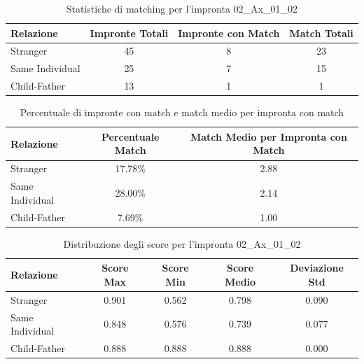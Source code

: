 \begin{table}[htbp]
\centering
\caption{Statistiche di matching per l'impronta 02\_Ax\_01\_02}
\label{tab:results_02_Ax_01_02}
\begin{tabular}{|l|c|c|c|}
\hline
\textbf{Relazione} & \textbf{Impronte Totali} & \textbf{Impronte con Match} & \textbf{Match Totali} \\
\hline
Stranger & 45 & 8 & 23 \\
\hline
Same Individual & 25 & 7 & 15 \\
\hline
Child-Father & 13 & 1 & 1 \\
\hline
\end{tabular}
\end{table}


\begin{table}[htbp]
\centering
\caption{Percentuale di impronte con match e match medio per impronta con match}
\label{tab:match_percentage_02_Ax_01_02}
\begin{tabular}{|l|c|c|}
\hline
\textbf{Relazione} & \textbf{Percentuale Match} & \textbf{Match Medio per Impronta con Match} \\
\hline
Stranger & 17.78\% & 2.88 \\
\hline
Same Individual & 28.00\% & 2.14 \\
\hline
Child-Father & 7.69\% & 1.00 \\
\hline
\end{tabular}
\end{table}


\begin{table}[htbp]
\centering
\caption{Distribuzione degli score per l'impronta 02\_Ax\_01\_02}
\label{tab:scores_02_Ax_01_02}
\begin{tabular}{|l|c|c|c|c|}
\hline
\textbf{Relazione} & \textbf{Score Max} & \textbf{Score Min} & \textbf{Score Medio} & \textbf{Deviazione Std} \\
\hline
Stranger & 0.901 & 0.562 & 0.798 & 0.090 \\
\hline
Same Individual & 0.848 & 0.576 & 0.739 & 0.077 \\
\hline
Child-Father & 0.888 & 0.888 & 0.888 & 0.000 \\
\hline
\end{tabular}
\end{table}

